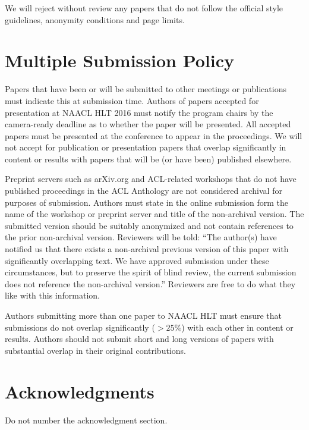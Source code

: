 \documentclass[11pt,letterpaper]{article}
\begin{document}
We will reject without review any papers that do not follow the
official style guidelines, anonymity conditions and page limits.

\section{Multiple Submission Policy}

Papers that have been or will be submitted to other meetings or
publications must indicate this at submission time. Authors of
papers accepted for presentation at NAACL HLT 2016 must notify the
program chairs by the camera-ready deadline as to whether the paper
will be presented. All accepted papers must be presented at the
conference to appear in the proceedings. We will not accept for
publication or presentation papers that overlap significantly in
content or results with papers that will be (or have been) published
elsewhere.

Preprint servers such as arXiv.org and ACL-related workshops that
do not have published proceedings in the ACL Anthology are not
considered archival for purposes of submission. Authors must state
in the online submission form the name of the workshop or preprint
server and title of the non-archival version.  The submitted version
should be suitably anonymized and not contain references to the
prior non-archival version. Reviewers will be told: ``The author(s)
have notified us that there exists a non-archival previous version
of this paper with significantly overlapping text. We have approved
submission under these circumstances, but to preserve the spirit
of blind review, the current submission does not reference the
non-archival version.'' Reviewers are free to do what they like with
this information.

Authors submitting more than one paper to NAACL HLT must ensure
that submissions do not overlap significantly ($>25\%$) with each other
in content or results. Authors should not submit short and long
versions of papers with substantial overlap in their original
contributions.

\section*{Acknowledgments}

Do not number the acknowledgment section.



\end{document}
